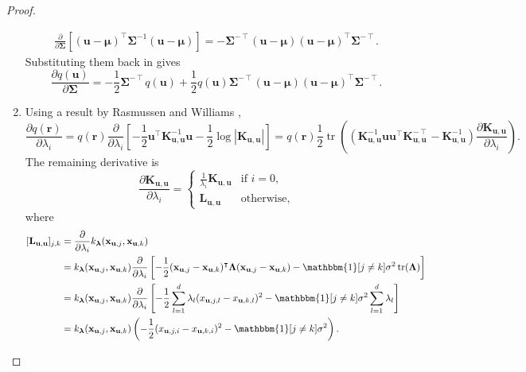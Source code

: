 \documentclass{article}
\theoremstyle{definition}
\theoremstyle{remark}
\DeclareMathOperator{\tr}{tr}
\newcommand{\Kuu}{\mathbf{K}_{\mathbf{u},\mathbf{u}}}
\newcommand{\Luu}{\mathbf{L}_{\mathbf{u},\mathbf{u}}}
\newcommand{\dS}{\frac{\partial}{\partial\bm\Sigma}}
\newcommand{\dl}{\frac{\partial}{\partial \lambda_i}}
\begin{document}
\begin{proof}
\begin{enumerate}
\begin{gather*}
      \dS[(\mathbf{u} - \bm\mu)^\intercal\bm\Sigma^{-1}(\mathbf{u} -
      \bm\mu)] = -\bm\Sigma^{-\intercal}(\mathbf{u} - \bm\mu)(\mathbf{u} -
                     \bm\mu)^\intercal\bm\Sigma^{-\intercal}.
    \end{gather*}
    Substituting them back in gives
    \[
      \frac{\partial q(\mathbf{u})}{\partial \bm\Sigma} =
      -\frac{1}{2}\bm\Sigma^{-\intercal}q(\mathbf{u}) +
      \frac{1}{2}q(\mathbf{u})\bm\Sigma^{-\intercal}(\mathbf{u} -
      \bm\mu)(\mathbf{u} - \bm\mu)^\intercal\bm\Sigma^{-\intercal}.
    \]
  \item Using a result by Rasmussen and Williams
    \cite{DBLP:books/lib/RasmussenW06},
    \[
      \frac{\partial q(\mathbf{r})}{\partial \lambda_i} = q(\mathbf{r}) \dl
      \left[-\frac{1}{2}\mathbf{u}^\intercal\Kuu^{-1}\mathbf{u} -
        \frac{1}{2}\log|\Kuu| \right] = q(\mathbf{r})\frac{1}{2}\tr
      \left((\Kuu^{-1}\mathbf{u}\mathbf{u}^\intercal\Kuu^{-\intercal} - \Kuu^{-1})
        \frac{\partial \Kuu}{\partial \lambda_i} \right).
    \]
    The remaining derivative is
    \[
      \frac{\partial \Kuu}{\partial \lambda_i} =
      \begin{cases}
        \frac{1}{\lambda_i}\Kuu & \text{if } i = 0, \\
        \Luu & \text{otherwise,}
      \end{cases}
    \]
    where
    \[
      \begin{split}
        [\Luu]_{j,k} &= \dl k_{\bm\lambda}(\mathbf{x}_{\mathbf{u},j},
        \mathbf{x}_{\mathbf{u},k}) \\
        &= k_{\bm\lambda}(\mathbf{x}_{\mathbf{u},j}, \mathbf{x}_{\mathbf{u},k})
        \dl \left[-\frac{1}{2}(\mathbf{x}_{\mathbf{u},j} -
          \mathbf{x}_{\mathbf{u},k})^\intercal \bm\Lambda
          (\mathbf{x}_{\mathbf{u},j} - \mathbf{x}_{\mathbf{u},k}) -
          \mathbbm{1}[j \ne k]\sigma^2\tr(\bm\Lambda) \right] \\
        &= k_{\bm\lambda}(\mathbf{x}_{\mathbf{u},j}, \mathbf{x}_{\mathbf{u},k})
        \dl \left[-\frac{1}{2}\sum_{l=1}^d \lambda_l
          (x_{\mathbf{u},j,l} - x_{\mathbf{u},k,l})^2 -
          \mathbbm{1}[j \ne k]\sigma^2\sum_{l=1}^d \lambda_l \right] \\
        &= k_{\bm\lambda}(\mathbf{x}_{\mathbf{u},j}, \mathbf{x}_{\mathbf{u},k})
        \left( -\frac{1}{2}(x_{\mathbf{u},j,i} -
        x_{\mathbf{u},k,i})^2 - \mathbbm{1}[j \ne k]\sigma^2 \right).
      \end{split}
    \]
  \end{enumerate}
\end{proof}
\end{document}
